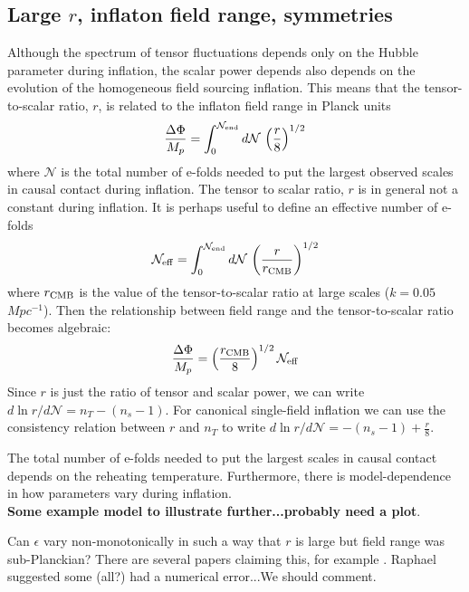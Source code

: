 \subsection{Large $r$, inflaton field range, symmetries}
Although the spectrum of tensor fluctuations depends only on the Hubble parameter during inflation, the scalar power depends also depends on the evolution of the homogeneous field sourcing inflation. This means that the tensor-to-scalar ratio, $r$, is related to the inflaton field range in Planck units \cite{Lyth:1996im}
\begin{equation}
\frac{\Delta\Phi}{M_p}=\int_0^{\mathcal{N}_{\rm end}}d\mathcal{N}\,\left(\frac{r}{8}\right)^{1/2}
\end{equation}
where $\mathcal{N}$ is the total number of e-folds needed to put the largest observed scales in causal contact during inflation. The tensor to scalar ratio, $r$ is in general not a constant during inflation. It is perhaps useful to define an effective number of e-folds
\begin{equation}
\mathcal{N}_{\rm eff}=\int_0^{\mathcal{N}_{\rm end}}d\mathcal{N}\,\left(\frac{r}{r_{\rm CMB}}\right)^{1/2}
\end{equation}
where $r_{\rm CMB}$ is the value of the tensor-to-scalar ratio at large scales ($k=0.05$ $Mpc^{-1}$). Then the relationship between field range and the tensor-to-scalar ratio becomes algebraic:
\begin{equation}
\frac{\Delta\Phi}{M_p}=\left(\frac{r_{\rm CMB}}{8}\right)^{1/2}\mathcal{N}_{\rm eff}
\end{equation}
Since $r$ is just the ratio of tensor and scalar power, we can write $d\ln r/d\mathcal{N}=n_T-(n_s-1)$. For canonical single-field inflation we can use the consistency relation between $r$ and $n_T$ to write $d\ln r/d\mathcal{N}=-(n_s-1)+\frac{r}{8}$.

The total number of e-folds needed to put the largest scales in causal contact depends on the reheating temperature. Furthermore, there is model-dependence in how parameters vary during inflation.\\

{\bf Some example model to illustrate further...probably need a plot}.

Can $\epsilon$ vary non-monotonically in such a way that $r$ is large but field range was sub-Planckian? There are several papers claiming this, for example \cite{BenDayan:2009kvHotchkiss:2011gzm, Chatterjee:2014hna}. Raphael suggested some (all?) had a numerical error...We should comment.

